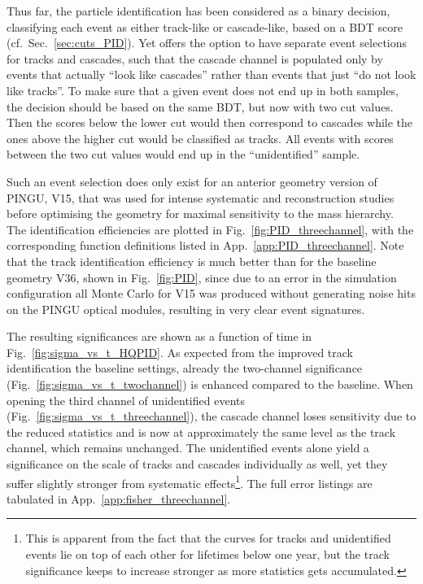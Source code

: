 \noindent
Thus far, the particle identification has been considered as a binary decision,
classifying each event as either track-like or cascade-like, based on a BDT 
score (cf.\ Sec.~\ref{sec:cuts_PID}). Yet \papa offers the option to have 
separate event selections for tracks and cascades, such that \eg the cascade 
channel is populated only by events that actually ``look like cascades'' rather 
than events that just ``do not look like tracks''. To make sure that a given 
event does not end up in both samples, the decision should be based on the same 
BDT, but now with two cut values. Then the scores below the lower cut would 
then \eg correspond to cascades while the ones above the higher cut would be 
classified as tracks. All events with scores between the two cut values would 
end up in the ``unidentified'' sample.

Such an event selection does only exist for an anterior geometry version of 
PINGU, V15, that was used for intense systematic and reconstruction studies 
before optimising the geometry for maximal sensitivity to the mass hierarchy. 
The identification efficiencies are plotted in Fig.~\ref{fig:PID_threechannel}, 
with the corresponding function definitions listed in 
App.~\ref{app:PID_threechannel}. Note that the track identification efficiency 
is much better than for the baseline geometry V36, shown in Fig.~\ref{fig:PID}, 
since due to an error in the simulation configuration all Monte Carlo for V15 
was produced without generating noise hits on the PINGU optical modules, 
resulting in very clear event signatures.

The resulting significances are shown as a function of time in 
Fig.~\ref{fig:sigma_vs_t_HQPID}. As expected from the improved track
identification \wrt the baseline settings, already the two-channel significance
(Fig.~\ref{fig:sigma_vs_t_twochannel}) is enhanced compared to the baseline.
When opening the third channel of unidentified events
(Fig.~\ref{fig:sigma_vs_t_threechannel}), the cascade channel loses sensitivity
due to the reduced statistics and is now at approximately the same level as the
track channel, which remains unchanged. The unidentified events alone yield a
significance on the scale of tracks and cascades individually as well, yet they
suffer slightly stronger from systematic effects\footnote{This is apparent from
the fact that the curves for tracks and unidentified events lie on top of each
other for lifetimes below one year, but the track significance keeps to increase
stronger as more statistics gets accumulated.}. The full error listings are
tabulated in App.~\ref{app:fisher_threechannel}.

